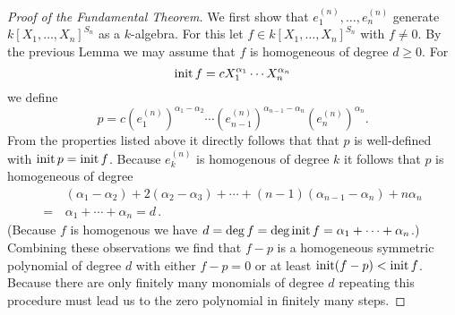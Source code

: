 \begin{proof}[Proof of the Fundamental Theorem]
  We first show that $e^{(n)}_1, \dotsc, e^{(n)}_n$ generate $k[X_1, \dotsc, X_n]^{S_n}$ as a $k$-algebra.
  For this let $f \in k[X_1, \dotsc, X_n]^{S_n}$ with $f \neq 0$.
  By the previous Lemma we may assume that $f$ is homogeneous of degree $d \geq 0$.
  For
  \[
      \operatorname{init} f
    = c X_1^{\alpha_1} \dotsm X_n^{\alpha_n}
  \]
  we define
  \[
      p
    =         c
              \left( e^{(n)}_1 \right)^{\alpha_1 - \alpha_2}
      \dotsm \left( e^{(n)}_{n-1} \right)^{\alpha_{n-1} - \alpha_n}
              \left( e^{(n)}_n \right)^{\alpha_n}.
  \]
  From the properties listed above it directly follows that that $p$ is well-defined with $\operatorname{init} p = \operatorname{init} f$.
  Because $e^{(n)}_k$ is homogenous of degree $k$ it follows that $p$ is homogeneous of degree
  \begin{align*}
     &\,  (\alpha_1-\alpha_2) + 2(\alpha_2-\alpha_3) + \dotsb + (n-1)(\alpha_{n-1}-\alpha_n)+n\alpha_n \\
    =&\,  \alpha_1 + \dotsb + \alpha_n
    =     d \,.
  \end{align*}
  (Because $f$ is homogenous we have $d = \deg f = \deg \operatorname{init} f = \alpha_1 + \dotsb + \alpha_n$.)
  Combining these observations we find that $f-p$ is a homogeneous symmetric polynomial of degree $d$ with either $f-p = 0$ or at least $\operatorname{init} (f-p) < \operatorname{init} f$.
  Because there are only finitely many monomials of degree $d$ repeating this procedure must lead us to the zero polynomial in finitely many steps.
  

\end{proof}

